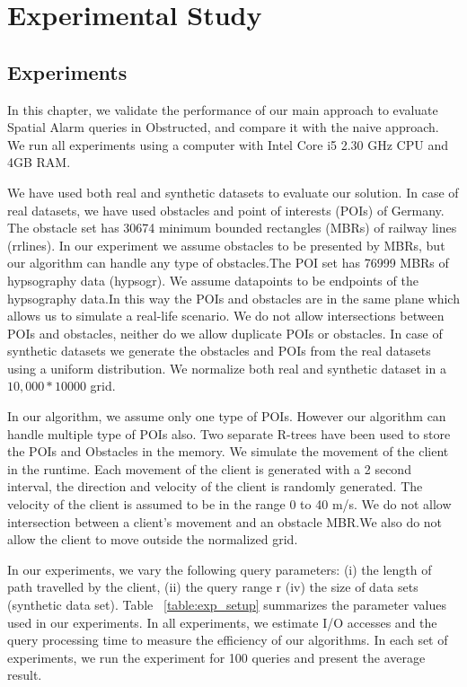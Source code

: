 \chapter{Experimental Study}
\section{\label{sec:exp}Experiments}
\label{sec:exp}
In this chapter, we validate the performance of our main approach to evaluate Spatial Alarm queries in Obstructed, and compare it with the naive approach. We run all experiments using a computer with Intel Core i5 2.30 GHz CPU and 4GB RAM.


We have used both real and synthetic datasets to evaluate our solution. In case of real datasets, we have used obstacles and point of interests (POIs) of Germany. The obstacle set has 30674 minimum bounded rectangles (MBRs) of railway lines (rrlines). In our experiment we assume obstacles to be presented by MBRs, but our algorithm can handle any type of obstacles.The POI set has 76999 MBRs of hypsography data (hypsogr). We assume datapoints to be endpoints of the hypsography data.In this way the POIs and obstacles are in the same plane which allows us to simulate a real-life scenario. We do not allow intersections between POIs and obstacles, neither do we allow duplicate POIs or obstacles. In case of synthetic datasets we generate the obstacles and POIs from the real datasets using a uniform distribution.
We normalize both real and synthetic dataset in a $10,000 * 10000$ grid. 

In our algorithm, we assume only one type of POIs. However our algorithm can handle multiple type of POIs also. Two separate R-trees have been used to store the POIs and Obstacles in the memory. We simulate the movement of the client in the runtime. Each movement of the client is generated with a 2 second interval, the direction and velocity of the client is randomly generated. The velocity of the client is assumed to be in the range 0 to 40 m/s. We do not allow intersection between a client's movement and an obstacle MBR.We also do not allow the client to move outside the normalized grid.  

In our experiments, we vary the following query parameters: (i) the length of path  travelled by the client, (ii) the query range r (iv) the size of data sets (synthetic data set). Table ~\ref{table:exp_setup} summarizes the parameter values used in our experiments. In all experiments, we estimate I/O accesses and the query processing time to measure the efficiency of our algorithms. In each set of experiments, we run the experiment for 100 queries and present the average result.

